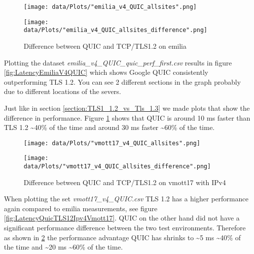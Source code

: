 \begin{figure}[!thb]
	\centering
	\begin{minipage}{.45\textwidth}
		\centering
		\texttt{[image: data/Plots/"emilia\_v4\_QUIC\_allsites".png]}
		\caption{Latency of QUIC and TLS 1.2 from 267 websites measured over several days on emilia}
  		\label{fig:LatencyEmiliaV4QUIC}
  	\end{minipage}%
  	\hspace{0.5cm}
  	\begin{minipage}{.45\textwidth}
		\centering
		\texttt{[image: data/Plots/"emilia\_v4\_QUIC\_allsites\_difference".png]}
		\caption{Difference between QUIC and TCP/TLS1.2 on emilia}
  		\label{fig:DiffQuicTLS12}
  	\end{minipage}
\end{figure}
Plotting the dataset \textit{emilia\_v4\_QUIC\_quic\_perf\_first.csv} results in figure \ref{fig:LatencyEmiliaV4QUIC} which shows Google QUIC consistently outperforming TLS 1.2.
You can see 2 different sections in the graph probably due to different locations of the severs. 

Just like in section \ref{section:TLS1_1.2_vs_Tls_1.3} we made plots that show the difference in performance.
Figure \ref{fig:DiffQuicTLS12} shows that QUIC is around 10 ms  faster than TLS 1.2 \textasciitilde 40\% of the time and around 30 ms faster \textasciitilde 60\% of the time.


\begin{figure}[!thb]
	\centering
	\begin{minipage}{.45\textwidth}
		\centering
		\texttt{[image: data/Plots/"vmott17\_v4\_QUIC\_allsites".png]}
		\caption{Latency of QUIC and TCP/TLS1.2 on vmott17 with IPv4}
  		\label{fig:LatencyQuicTLS12Ipv4Vmott17}
  		\centering
  	\end{minipage}%
  	\hspace{0.5cm}
  	\begin{minipage}{.45\textwidth}
  		\centering
  		\texttt{[image: data/Plots/"vmott17\_v4\_QUIC\_allsites\_difference".png]}
		\caption{Difference between QUIC and TCP/TLS1.2 on vmott17 with IPv4}
  		\label{fig:DiffQuicTLS12Ipv4Vmott17}
  	\end{minipage}
\end{figure}

When plotting the set \textit{vmott17\_v4\_QUIC.csv} TLS 1.2 has a higher performance again compared to emilia measurements, see figure \ref{fig:LatencyQuicTLS12Ipv4Vmott17}.
QUIC on the other hand did not have a significant performance difference between the two test environments.
Therefore as shown in \ref{fig:DiffQuicTLS12Ipv4Vmott17} the performance advantage QUIC has shrinks to \textasciitilde 5 ms \textasciitilde 40\% of the time and \textasciitilde 20 ms \textasciitilde 60\% of the time.



